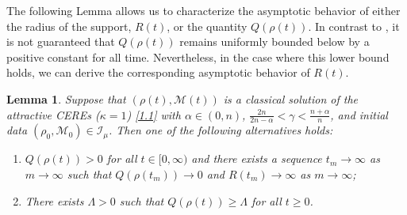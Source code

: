 \documentclass[reqno,11pt]{amsart}
\numberwithin{equation}{section}
\newtheorem{lemma}[theorem]{Lemma}
\theoremstyle{definition}
\begin{document}
The following Lemma allows us to characterize the asymptotic behavior of either
the radius of the support, $R(t)$, or the quantity $Q(\rho(t))$. 
In contrast to \cite{Cheng_2025}, 
it is not guaranteed that $Q(\rho(t))$ remains uniformly bounded below by a positive constant 
for all time. Nevertheless, in the case where this lower bound holds, we can derive the 
corresponding asymptotic behavior of $R(t)$.

\begin{lemma}\label{boundbel}
    Suppose that $(\rho(t),\mathcal{M}(t))$ is a classical solution of the attractive CEREs {\rm (}$\kappa = 1${\rm )} \eqref{1.1} with $\alpha \in (0,n)$,
    $\frac{2n}{2n - \alpha} < \gamma < \frac{n + \alpha}{n}$, and
    initial data $(\rho_0,\mathcal{M}_0) \in \mathcal{I}_\mu$. 
    Then one of the following alternatives holds{\rm :}
    \begin{enumerate}
\item[\rm (i)] $Q(\rho(t)) > 0$ for all $t \in [0,\infty)$ and there exists a sequence $t_m \to \infty$ as $m \to \infty$ such that $Q(\rho(t_m)) \to 0$ and $R(t_m) \to \infty$ as $m \to \infty${\rm ;}

\smallskip
\item[\rm (ii)] There exists $\Lambda > 0$ 
    such that $Q(\rho(t)) \geq \Lambda$ for all $t \geq 0$.
\end{enumerate}
\end{lemma}
\end{document}
